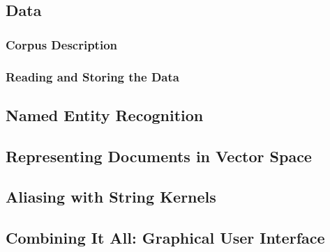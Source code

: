 \subsection{Data}\label{sec:data}
\subsubsection{Corpus Description}\label{sec:description_of_the_castro_archive}

\subsubsection{Reading and Storing the Data}\label{sec:reading_and_storing_the_data}

\subsection{Named Entity Recognition}\label{sec:stanford_named_entity_recognizer}


\subsection{Representing Documents in Vector Space}\label{sec:representing_documents_in_vector_space}


\subsection{Aliasing with String Kernels}\label{sec:aliasing}


\subsection{Combining It All: Graphical User Interface}\label{sec:gui}

